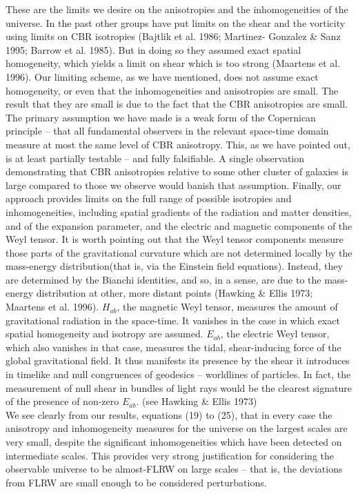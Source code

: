 These are the limits we desire on the anisotropies and the inhomogeneities 
of the universe. In the past other groups have put limits on the shear and 
the vorticity using limits on CBR isotropies (Bajtlik et al. 1986; Martinez-
Gonzalez \& Sanz 1995; Barrow et al. 1985). But in doing so they assumed 
exact spatial homogeneity, which yields a limit on shear which is too
strong (Maartens et al. 1996). Our limiting scheme, as we have mentioned, 
does not assume exact homogeneity, or even that the inhomogeneities and 
anisotropies are small. The result that they are small is due to the fact 
that the CBR anisotropies are small. The primary assumption we have made is 
a weak form of the Copernican principle -- that all fundamental observers 
in the relevant space-time domain measure at most the same level of CBR 
anisotropy. This, as we have pointed out, is at least partially testable -- 
and fully falsifiable. A single observation demonstrating that CBR 
anisotropies relative to some other cluster of galaxies is large compared 
to those we observe would banish that assumption. Finally, our approach 
provides limits on the full range of possible isotropies and 
inhomogeneities, including spatial gradients of the radiation and matter 
densities, and of the expansion parameter, and the electric and magnetic 
components of the Weyl tensor. It is worth pointing out that the Weyl 
tensor components measure those parts of the gravitational curvature which 
are not determined locally by the mass-energy distribution(that is, via 
the Einstein field equations). Instead, they are determined by the Bianchi 
identities, and so, in a sense, are due to the mass-energy distribution 
at other, more distant points (Hawking \& Ellis 1973; Maartens et
al. 1996). $H_{ab}$, the magnetic Weyl tensor, measures the amount of 
gravitational radiation in the space-time. It vanishes in the case in which 
exact spatial homogeneity and isotropy are assumed. $E_{ab}$, the electric 
Weyl tensor, which also vanishes in that case, measures the tidal, 
shear-inducing force of the global gravitational field. It thus manifests 
its presence by the shear it introduces in timelike and null congruences 
of geodesics -- worldlines of particles. In fact, the measurement of null 
shear in bundles of light rays would be the clearest signature of the 
presence of non-zero $E_{ab}$. (see Hawking \& Ellis 1973) \\

We see clearly from our results, equations (19) to (25), that in every case
the anisotropy and inhomogeneity measures for the universe on the largest 
scales are very small, despite the significant inhomogeneities which have 
been detected on intermediate scales. This provides very strong justification 
for considering the observable universe to be almost-FLRW on large 
scales -- that is, the deviations from FLRW are small enough to be 
considered perturbations. \\


